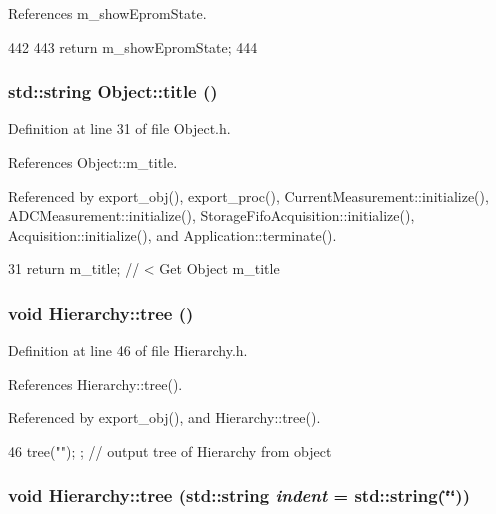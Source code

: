 References m\_\-showEpromState.


\begin{DoxyCode}
442                          {
443     return m_showEpromState;
444   }  
\end{DoxyCode}
\hypertarget{classObject_a73a0f1a41828fdd8303dd662446fb6c3}{
\subsubsection[{title}]{\setlength{\rightskip}{0pt plus 5cm}std::string Object::title ()}}
\label{classObject_a73a0f1a41828fdd8303dd662446fb6c3}


Definition at line 31 of file Object.h.

References Object::m\_\-title.

Referenced by export\_\-obj(), export\_\-proc(), CurrentMeasurement::initialize(), ADCMeasurement::initialize(), StorageFifoAcquisition::initialize(), Acquisition::initialize(), and Application::terminate().


\begin{DoxyCode}
31 { return m_title;      } // < Get Object m_title
\end{DoxyCode}
\hypertarget{classHierarchy_a594c294c5f60c230e106d522ed008212}{
\subsubsection[{tree}]{\setlength{\rightskip}{0pt plus 5cm}void Hierarchy::tree ()}}
\label{classHierarchy_a594c294c5f60c230e106d522ed008212}


Definition at line 46 of file Hierarchy.h.

References Hierarchy::tree().

Referenced by export\_\-obj(), and Hierarchy::tree().


\begin{DoxyCode}
46 { tree(""); };                     // output tree of Hierarchy from object
\end{DoxyCode}
\hypertarget{classHierarchy_a76e914b9a677a22a82deb74d892bf261}{
\subsubsection[{tree}]{\setlength{\rightskip}{0pt plus 5cm}void Hierarchy::tree (std::string {\em indent} = {\ttfamily std::string(\char`\"{}\char`\"{})})}}
\label{classHierarchy_a76e914b9a677a22a82deb74d892bf261}


